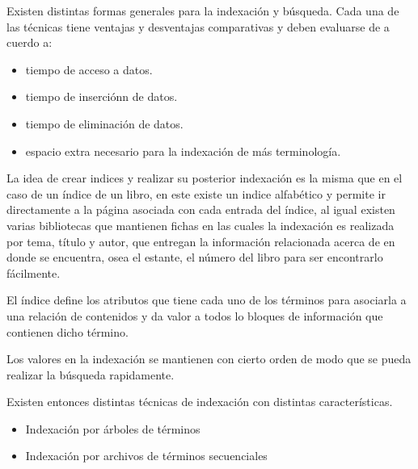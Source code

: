 \documentclass[11pt,a4paper]{article}
\begin{document}
Existen distintas formas generales para la indexación y búsqueda. Cada una de las técnicas tiene ventajas y desventajas comparativas y deben evaluarse de a cuerdo a:

\newpage

\begin{itemize}
\item tiempo de acceso a datos.
\item tiempo de inserciónn de datos.
\item tiempo de eliminación de datos.
\item espacio extra necesario para la indexación de más terminología.
\end{itemize}

La idea de crear indices y realizar su posterior indexación es la misma que en el caso de un índice de un libro, en este existe un indice alfabético y permite ir directamente a la página asociada con cada entrada del índice, al igual existen varias bibliotecas que mantienen fichas en las cuales la indexación es realizada por tema, título y autor, que entregan la información relacionada acerca de en donde se encuentra, osea el estante, el número del libro para ser encontrarlo fácilmente.

El índice define los atributos que tiene cada uno de los términos para asociarla a una relación de contenidos y da valor a todos lo bloques de información que contienen dicho término.

Los valores en la indexación se mantienen con cierto orden de modo que se pueda realizar la búsqueda rapidamente.

Existen entonces distintas técnicas de indexación con distintas características.

\begin{itemize}
\item Indexación por árboles de términos
\item Indexación por archivos de términos secuenciales
\end{itemize}
\end{document}

